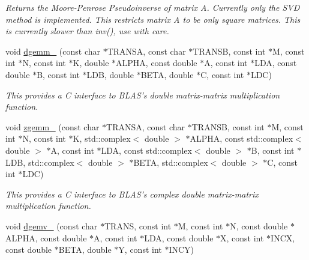 \begin{DoxyCompactItemize}
\begin{DoxyCompactList}\small\item\em Returns the Moore-\/\-Penrose Pseudoinverse of matrix A. Currently only the S\-V\-D method is implemented. This restricts matrix A to be only square matrices. This is currently slower than inv(), use with care. \end{DoxyCompactList}\item 
\hypertarget{namespacekeycpp_a16b58f47ed977cafdc96227468f5f10a}{void \hyperlink{namespacekeycpp_a16b58f47ed977cafdc96227468f5f10a}{dgemm\-\_\-} (const char $\ast$T\-R\-A\-N\-S\-A, const char $\ast$T\-R\-A\-N\-S\-B, const int $\ast$M, const int $\ast$N, const int $\ast$K, double $\ast$A\-L\-P\-H\-A, const double $\ast$A, const int $\ast$L\-D\-A, const double $\ast$B, const int $\ast$L\-D\-B, double $\ast$B\-E\-T\-A, double $\ast$C, const int $\ast$L\-D\-C)}\label{namespacekeycpp_a16b58f47ed977cafdc96227468f5f10a}

\begin{DoxyCompactList}\small\item\em This provides a C interface to B\-L\-A\-S's double matrix-\/matrix multiplication function. \end{DoxyCompactList}\item 
\hypertarget{namespacekeycpp_a29fb4e46ee1b9cce0fd8bc79a2490c72}{void \hyperlink{namespacekeycpp_a29fb4e46ee1b9cce0fd8bc79a2490c72}{zgemm\-\_\-} (const char $\ast$T\-R\-A\-N\-S\-A, const char $\ast$T\-R\-A\-N\-S\-B, const int $\ast$M, const int $\ast$N, const int $\ast$K, std\-::complex$<$ double $>$ $\ast$A\-L\-P\-H\-A, const std\-::complex$<$ double $>$ $\ast$A, const int $\ast$L\-D\-A, const std\-::complex$<$ double $>$ $\ast$B, const int $\ast$L\-D\-B, std\-::complex$<$ double $>$ $\ast$B\-E\-T\-A, std\-::complex$<$ double $>$ $\ast$C, const int $\ast$L\-D\-C)}\label{namespacekeycpp_a29fb4e46ee1b9cce0fd8bc79a2490c72}

\begin{DoxyCompactList}\small\item\em This provides a C interface to B\-L\-A\-S's complex double matrix-\/matrix multiplication function. \end{DoxyCompactList}\item 
\hypertarget{namespacekeycpp_af0676a4a89dbb63f09fc627c05e12699}{void \hyperlink{namespacekeycpp_af0676a4a89dbb63f09fc627c05e12699}{dgemv\-\_\-} (const char $\ast$T\-R\-A\-N\-S, const int $\ast$M, const int $\ast$N, const double $\ast$A\-L\-P\-H\-A, const double $\ast$A, const int $\ast$L\-D\-A, const double $\ast$X, const int $\ast$I\-N\-C\-X, const double $\ast$B\-E\-T\-A, double $\ast$Y, const int $\ast$I\-N\-C\-Y)}\label{namespacekeycpp_af0676a4a89dbb63f09fc627c05e12699}


\end{DoxyCompactItemize}
